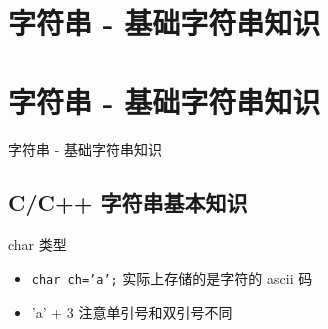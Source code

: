 
\def\sectionName{字符串 - 基础字符串知识}



\isBeamerMode\relax
    \section[\TOCName]{\sectionName}
\fi
\isBeamerMode\relax
    \section[\TOCName\ -\ \sectionName]{\sectionName}
\fi

\begin{frame}

\isBeamerMode\relax
    {\Huge \sectionName}\par
\fi







\end{frame}

\subsection{C/C++ 字符串基本知识}
\begin{frame}{char 类型} %
\begin{itemize}
    \item \texttt{char ch='a';} 实际上存储的是字符的 ascii 码
    \item 'a' + 3 注意单引号和双引号不同
\end{itemize}
\end{frame}

